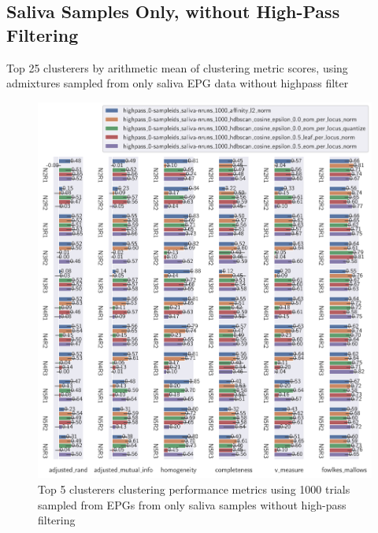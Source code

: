\begin{theappendices}
\subsection{Saliva Samples Only, without High-Pass Filtering}

\begin{table}[H]
\centering
{}
\caption{Top 25 clusterers by arithmetic mean of clustering metric scores, using admixtures sampled from only saliva EPG data without highpass filter}
\label{table:top_25_not_ensemble_clusterers_by_metrics_highpass_0-sampleids_saliva-nruns_1000}
\end{table}

\begin{figure}[H]
\centering
\includegraphics[width=\textwidth]{./figures/clust_comparison/highpass_0-sampleids_saliva-nruns_1000_top_5_clusterers_by_metrics.pdf}
\caption{Top 5 clusterers clustering performance metrics using 1000 trials sampled from EPGs from only saliva samples without high-pass filtering}
\label{fig:highpass_0-sampleids_saliva-nruns_1000_top_5_clusterers_by_metrics}
\end{figure}


\end{theappendices}
